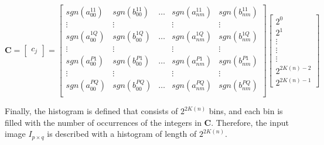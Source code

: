 \documentclass[]{spie}  %
\begin{document}
\begin{equation}
\mathbf{C} = 
\begin{bmatrix}
c_{j}
\end{bmatrix}=
  \begin{bmatrix}
sgn(a_{00}^{11}) & sgn(b_{00}^{11}) & \hdots & sgn(a_{nm}^{11}) & sgn(b_{nm}^{11}) \\
  \vdots  & \vdots & & \vdots  & \vdots\\
sgn(a_{00}^{1Q}) & sgn(b_{00}^{1Q}) & \hdots & sgn(a_{nm}^{1Q}) & sgn(b_{nm}^{1Q}) \\
  \vdots  & \vdots & & \vdots  & \vdots\\
sgn(a_{00}^{P1}) & sgn(b_{00}^{P1}) & \hdots & sgn(a_{nm}^{P1}) & sgn(b_{nm}^{P1}) \\
  \vdots  & \vdots & & \vdots  & \vdots\\
sgn(a_{00}^{PQ}) &sgn(b_{00}^{PQ}) & \hdots & sgn(a_{nm}^{PQ}) & sgn(b_{nm}^{PQ}) \\
 \end{bmatrix}
 \begin{bmatrix}
2^0 \\
2^1 \\
 \vdots \\
 \vdots \\
 \vdots \\
 2^{2 K(n)-2} \\
 2^{2 K(n)-1}
 \end{bmatrix}
 \label{eq:lzm_coded}
\end{equation}

Finally, the histogram is defined that consists of $2^{2K(n)}$ bins, and each bin is filled with the number of occurrences of the integers in $\mathbf{C}$. Therefore, the input image $I_{p\times q}$ is described with a histogram of length of $2^{2K(n)}$.
\end{document}
